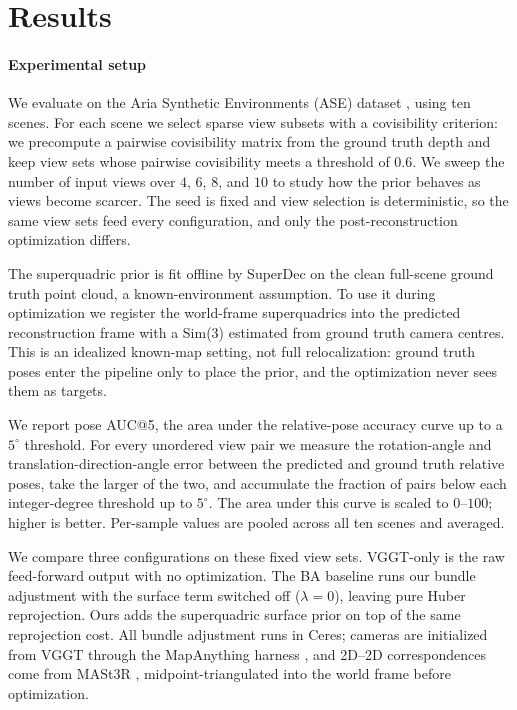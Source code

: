 \section{Results}

\paragraph{Experimental setup}
We evaluate on the Aria Synthetic Environments (ASE) dataset \cite{avetisyan2024scenescriptreconstructingscenesautoregressive}, using ten scenes. For each scene we select sparse view subsets with a covisibility criterion: we precompute a pairwise covisibility matrix from the ground truth depth and keep view sets whose pairwise covisibility meets a threshold of $0.6$. We sweep the number of input views over $4$, $6$, $8$, and $10$ to study how the prior behaves as views become scarcer. The seed is fixed and view selection is deterministic, so the same view sets feed every configuration, and only the post-reconstruction optimization differs.

The superquadric prior is fit offline by SuperDec \cite{fedele2026superdec3dscenedecomposition} on the clean full-scene ground truth point cloud, a known-environment assumption. To use it during optimization we register the world-frame superquadrics into the predicted reconstruction frame with a Sim(3) estimated from ground truth camera centres. This is an idealized known-map setting, not full relocalization: ground truth poses enter the pipeline only to place the prior, and the optimization never sees them as targets.

We report pose AUC@5, the area under the relative-pose accuracy curve up to a $5^{\circ}$ threshold. For every unordered view pair we measure the rotation-angle and translation-direction-angle error between the predicted and ground truth relative poses, take the larger of the two, and accumulate the fraction of pairs below each integer-degree threshold up to $5^{\circ}$. The area under this curve is scaled to $0$--$100$; higher is better. Per-sample values are pooled across all ten scenes and averaged.

We compare three configurations on these fixed view sets. VGGT-only is the raw feed-forward output with no optimization. The BA baseline runs our bundle adjustment with the surface term switched off ($\lambda = 0$), leaving pure Huber reprojection. Ours adds the superquadric surface prior on top of the same reprojection cost. All bundle adjustment runs in Ceres; cameras are initialized from VGGT through the MapAnything harness \cite{wang2025vggtvisualgeometrygrounded, keetha2026mapanythinguniversalfeedforwardmetric}, and 2D--2D correspondences come from MASt3R \cite{leroy2024groundingimagematching3d}, midpoint-triangulated into the world frame before optimization.

